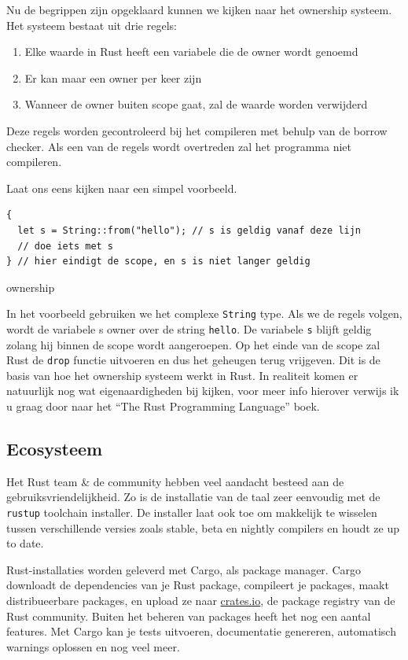 Nu de begrippen zijn opgeklaard kunnen we kijken naar het ownership systeem. Het systeem bestaat uit
drie regels: 
\begin{enumerate}
  \item Elke waarde in Rust heeft een variabele die de owner wordt genoemd 
  \item Er kan maar een owner per keer zijn 
  \item Wanneer de owner buiten scope gaat, zal de waarde worden verwijderd 
\end{enumerate}

Deze regels worden gecontroleerd bij het compileren met behulp van de borrow checker. Als een van de
regels wordt overtreden zal het programma niet compileren.  

Laat ons eens kijken naar een simpel voorbeeld.

\begin{listing}[h]
\begin{verbatim}
{
  let s = String::from("hello"); // s is geldig vanaf deze lijn
  // doe iets met s
} // hier eindigt de scope, en s is niet langer geldig
\end{verbatim}
\caption{ownership}
\end{listing}

In het voorbeeld gebruiken we het complexe \texttt{String} type. Als we de regels volgen,
wordt de variabele s owner over de string \texttt{hello}. De variabele
\texttt{s} blijft geldig zolang hij binnen de scope wordt aangeroepen. Op het einde van de
scope zal Rust de \texttt{drop} functie uitvoeren en dus het geheugen terug vrijgeven. Dit
is de basis van hoe het ownership systeem werkt in Rust. In realiteit komen er natuurlijk nog wat
eigenaardigheden bij kijken, voor meer info hierover verwijs ik u graag door naar het \enquote{The
Rust Programming Language} boek. \cite{rust_book}

\subsection{Ecosysteem}

Het Rust team \& de community hebben veel aandacht besteed aan de gebruiksvriendelijkheid. Zo is de
installatie van de taal zeer eenvoudig met de \texttt{rustup} toolchain installer. De
installer laat ook toe om makkelijk te wisselen tussen verschillende versies zoals stable, beta en
nightly compilers en houdt ze up to date.

Rust-installaties worden geleverd met Cargo, als package manager. Cargo downloadt de dependencies
van je Rust package, compileert je packages, maakt distribueerbare packages, en upload ze naar
\url{crates.io}, de package registry van de Rust community. Buiten het beheren van packages heeft
het nog een aantal features. Met Cargo kan je tests uitvoeren, documentatie genereren, automatisch
warnings oplossen en nog veel meer.


